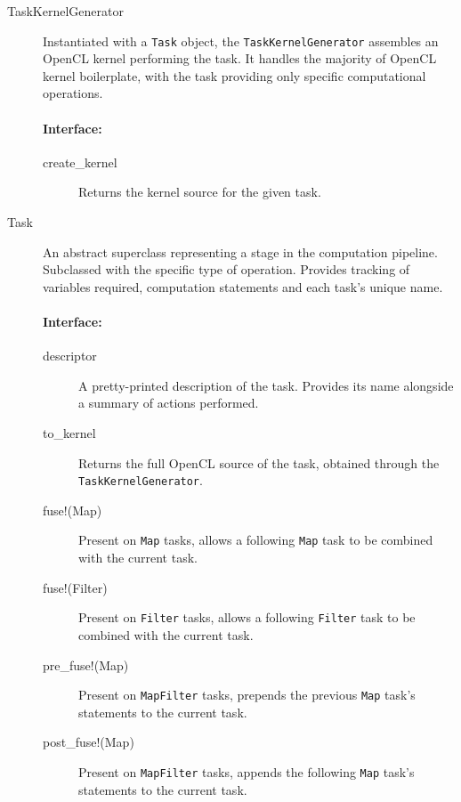 \begin{description}
\item[TaskKernelGenerator]
Instantiated with a \verb|Task| object, the \verb|TaskKernelGenerator| assembles an \ac{OpenCL} kernel performing the task. It handles the majority of \ac{OpenCL} kernel boilerplate, with the task providing only specific computational operations.

\paragraph*{Interface:}
\begin{description}
  \item[create\_kernel] Returns the kernel source for the given task.
\end{description}

\item[Task]
An abstract superclass representing a stage in the computation pipeline. Subclassed with the specific type of operation. Provides tracking of variables required, computation statements and each task's unique name.

\paragraph*{Interface:}
\begin{description}
  \item[descriptor] A pretty-printed description of the task. Provides its name alongside a summary of actions performed.

  \item[to\_kernel] Returns the full \ac{OpenCL} source of the task, obtained through the \verb|TaskKernelGenerator|.

  \item[fuse!(Map)] Present on \verb|Map| tasks, allows a following \verb|Map| task to be combined with the current task.

  \item[fuse!(Filter)] Present on \verb|Filter| tasks, allows a following \verb|Filter| task to be combined with the current task.

  \item[pre\_fuse!(Map)] Present on \verb|MapFilter| tasks, prepends the previous \verb|Map| task's statements to the current task.

  \item[post\_fuse!(Map)] Present on \verb|MapFilter| tasks, appends the following \verb|Map| task's statements to the current task.


\end{description}
\end{description}
